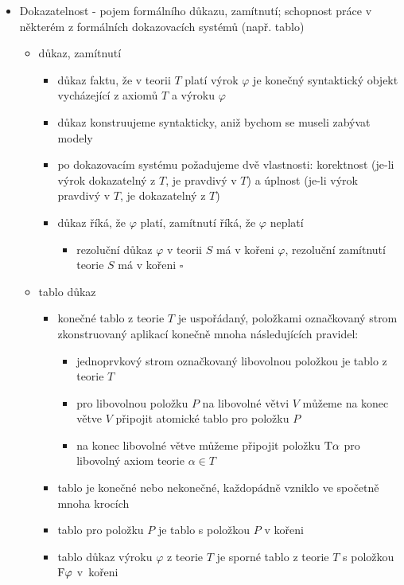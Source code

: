 \begin{itemize}
\begin{itemize}
\begin{itemize}
\item dostaneme $L'$-sentenci v PNF, kde $L'$ je rozšíření $L$ o nové $n_i$-ární funkční symboly
\end{itemize}
\end{itemize}
\item Dokazatelnost - pojem formálního důkazu, zamítnutí; schopnost práce v některém z formálních dokazovacích systémů (např. tablo)
\begin{itemize}
\item důkaz, zamítnutí
\begin{itemize}
\item důkaz faktu, že v teorii $T$ platí výrok $\varphi$ je konečný syntaktický objekt vycházející z axiomů $T$ a výroku $\varphi$
\item důkaz konstruujeme syntakticky, aniž bychom se museli zabývat modely
\item po dokazovacím systému požadujeme dvě vlastnosti: korektnost (je-li výrok dokazatelný z $T$, je pravdivý v $T$) a úplnost (je-li výrok pravdivý v $T$, je dokazatelný z $T$)
\item důkaz říká, že $\varphi$ platí, zamítnutí říká, že $\varphi$ neplatí
\begin{itemize}
\item rezoluční důkaz $\varphi$ v teorii $S$ má v kořeni $\varphi$, rezoluční zamítnutí teorie $S$ má v kořeni $\square$
\end{itemize}
\end{itemize}
\item tablo důkaz
\begin{itemize}
\item konečné tablo z teorie $T$ je uspořádaný, položkami označkovaný strom zkonstruovaný aplikací konečně mnoha následujících pravidel:
\begin{itemize}
\item jednoprvkový strom označkovaný libovolnou položkou je tablo z teorie $T$
\item pro libovolnou položku $P$ na libovolné větvi $V$ můžeme na konec větve $V$ připojit atomické tablo pro položku $P$
\item na konec libovolné větve můžeme připojit položku $\text T\alpha$ pro libovolný axiom teorie $\alpha\in T$
\end{itemize}
\item tablo je konečné nebo nekonečné, každopádně vzniklo ve spočetně mnoha krocích
\item tablo pro položku $P$ je tablo s položkou $P$ v kořeni
\item tablo důkaz výroku $\varphi$ z teorie $T$ je sporné tablo z teorie $T$ s  položkou $\text F\varphi$ v~kořeni

\end{itemize}
\end{itemize}
\end{itemize}
